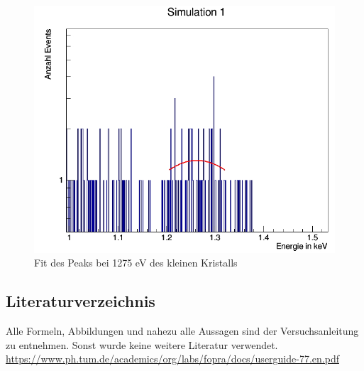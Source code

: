 \documentclass[a4paper,14pt,twoside]{article}
\begin{document}
\begin{figure}[H]
	\begin{center}
		\includegraphics[width=0.7\linewidth]{Simulation2_1275_fit}
		\caption{Fit des Peaks bei 1275 eV des kleinen Kristalls}
		\label{S2_1275_fit}
	\end{center}
\end{figure}


		
	\subsection{Literaturverzeichnis}
		Alle Formeln, Abbildungen und nahezu alle Aussagen sind der Versuchsanleitung zu entnehmen. 
	Sonst wurde keine weitere Literatur verwendet.\\
	\url{https://www.ph.tum.de/academics/org/labs/fopra/docs/userguide-77.en.pdf} \\
	
%
%
%
%
%
\end{document}
